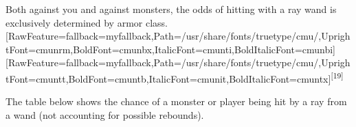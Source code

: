 Both against you and against monsters, the odds of hitting with a ray wand is exclusively determined by armor class.\allowbreak{}\setmainfont{cmunrm.ttf}[RawFeature={fallback=myfallback},Path=/usr/share/fonts/truetype/cmu/,UprightFont=cmunrm,BoldFont=cmunbx,ItalicFont=cmunti,BoldItalicFont=cmunbi]\setmonofont{cmunrm.ttf}[RawFeature={fallback=myfallback},Path=/usr/share/fonts/truetype/cmu/,UprightFont=cmuntt,BoldFont=cmuntb,ItalicFont=cmunit,BoldItalicFont=cmuntx]\textsuperscript{{$\text{[}$}19{$\text{]}$}}


The table below shows the chance of a monster or player being hit by a ray from a wand (not accounting for possible rebounds).




\begin{longtable}{|>{\RaggedRight}p{0.14380\linewidth}|>{\RaggedRight}p{0.22836\linewidth}|>{\RaggedRight}p{0.06892\linewidth}|>{\RaggedRight}p{0.11418\linewidth}|>{\RaggedRight}p{0.11094\linewidth}|>{\RaggedRight}p{0.16236\linewidth}|} \hline 

\end{longtable}
